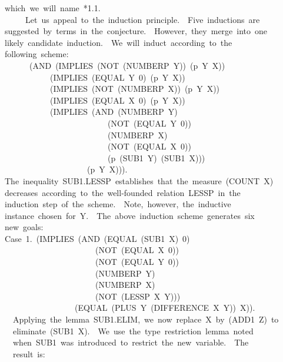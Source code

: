 \documentclass[11pt]{book}
\newenvironment{pubasis}{\begin{flushleft}\ttfamily\small}{\normalsize\rmfamily\end{flushleft}}
\begin{document}
\begin{pubasis}
~~which~we~will~name~*1.1.\\

~~~~~~~Let~us~appeal~to~the~induction~principle.~~Five~inductions~are\\
~~suggested~by~terms~in~the~conjecture.~~However,~they~merge~into~one\\
~~likely~candidate~induction.~~We~will~induct~according~to~the\\
~~following~scheme:\\
~~~~~~~~(AND~(IMPLIES~(NOT~(NUMBERP~Y))~(p~Y~X))\\
~~~~~~~~~~~~~(IMPLIES~(EQUAL~Y~0)~(p~Y~X))\\
~~~~~~~~~~~~~(IMPLIES~(NOT~(NUMBERP~X))~(p~Y~X))\\
~~~~~~~~~~~~~(IMPLIES~(EQUAL~X~0)~(p~Y~X))\\
~~~~~~~~~~~~~(IMPLIES~(AND~(NUMBERP~Y)\\
~~~~~~~~~~~~~~~~~~~~~~~~~~~(NOT~(EQUAL~Y~0))\\
~~~~~~~~~~~~~~~~~~~~~~~~~~~(NUMBERP~X)\\
~~~~~~~~~~~~~~~~~~~~~~~~~~~(NOT~(EQUAL~X~0))\\
~~~~~~~~~~~~~~~~~~~~~~~~~~~(p~(SUB1~Y)~(SUB1~X)))\\
~~~~~~~~~~~~~~~~~~~~~~(p~Y~X))).\\
~~The~inequality~SUB1.LESSP~establishes~that~the~measure~(COUNT~X)\\
~~decreases~according~to~the~well-founded~relation~LESSP~in~the\\
~~induction~step~of~the~scheme.~~Note,~however,~the~inductive\\
~~instance~chosen~for~Y.~~The~above~induction~scheme~generates~six\\
~~new~goals:\\

~~Case~1.~(IMPLIES~(AND~(EQUAL~(SUB1~X)~0)\\
~~~~~~~~~~~~~~~~~~~~~~~~(NOT~(EQUAL~X~0))\\
~~~~~~~~~~~~~~~~~~~~~~~~(NOT~(EQUAL~Y~0))\\
~~~~~~~~~~~~~~~~~~~~~~~~(NUMBERP~Y)\\
~~~~~~~~~~~~~~~~~~~~~~~~(NUMBERP~X)\\
~~~~~~~~~~~~~~~~~~~~~~~~(NOT~(LESSP~X~Y)))\\
~~~~~~~~~~~~~~~~~~~(EQUAL~(PLUS~Y~(DIFFERENCE~X~Y))~X)).\\

~~~~Applying~the~lemma~SUB1.ELIM,~we~now~replace~X~by~(ADD1~Z)~to\\
~~~~eliminate~(SUB1~X).~~We~use~the~type~restriction~lemma~noted\\
~~~~when~SUB1~was~introduced~to~restrict~the~new~variable.~~The\\
~~~~result~is:\\


\end{pubasis}
\end{document}
